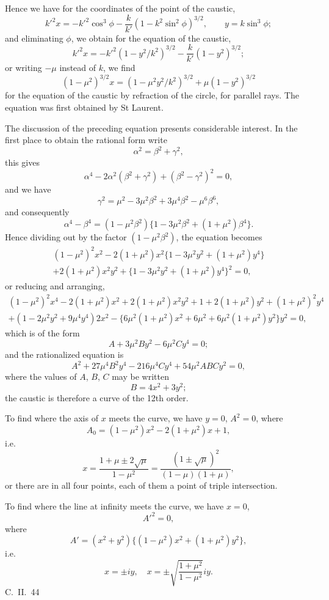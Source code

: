 \documentclass[11pt,a4paper]{article}
\begin{document}
Hence we have for the coordinates of the point of the caustic,
\[k'^2x = -k'^2\cos^3\phi - \frac{k}{k'}(1-k^2\sin^2\phi)^{3/2},\qquad y = k\sin^3\phi;\]
and eliminating $\phi$, we obtain for the equation of the caustic,
\[k'^2x = -k'^2(1-y^2/k^2)^{3/2} - \frac{k}{k'}(1-y^2)^{3/2};\]
or writing $-\mu$ instead of $k$, we find
\[(1-\mu^2)^{3/2}x = (1-\mu^2y^2/k^2)^{3/2} + \mu(1-y^2)^{3/2}\]
for the equation of the caustic by refraction of the circle, for parallel rays.
The equation was first obtained by St Laurent.

The discussion of the preceding equation presents considerable interest. In the
first place to obtain the rational form write
\[\alpha^2 = \beta^2 + \gamma^2,\]
this gives
\[\alpha^4 - 2\alpha^2(\beta^2 + \gamma^2) + (\beta^2 - \gamma^2)^2 = 0,\]
and we have
\[\gamma^2 = \mu^2 - 3\mu^2\beta^2 + 3\mu^4\beta^2 - \mu^6\beta^6,\]
and consequently
\[\alpha^4 - \beta^4 = (1-\mu^2\beta^2)\{1 - 3\mu^2\beta^2 + (1+\mu^2)\beta^4\}.\]
Hence dividing out by the factor $(1-\mu^2\beta^2)$, the equation becomes
\begin{multline*}
(1-\mu^2)^2x^2 - 2(1+\mu^2)x^2\{1 - 3\mu^2y^2 + (1+\mu^2)y^4\}\\
+ 2(1+\mu^2)x^2y^2 + \{1 - 3\mu^2y^2 + (1+\mu^2)y^4\}^2 = 0,
\end{multline*}
or reducing and arranging,
\begin{multline*}
(1-\mu^2)^2x^4 - 2(1+\mu^2)x^2 + 2(1+\mu^2)x^2y^2 + 1 + 2(1+\mu^2)y^2 + (1+\mu^2)^2y^4\\
+ (1 - 2\mu^2y^2 + 9\mu^4y^4)2x^2 - \{6\mu^2(1+\mu^2)x^2 + 6\mu^2 + 6\mu^2(1+\mu^2)y^2\}y^2 = 0,
\end{multline*}
which is of the form
\[A + 3\mu^2By^2 - 6\mu^2Cy^4 = 0;\]
and the rationalized equation is
\[A^2 + 27\mu^4B^2y^4 - 216\mu^4Cy^4 + 54\mu^2ABCy^2 = 0,\]
where the values of $A$, $B$, $C$ may be written
\[B = 4x^2 + 3y^2;\]
the caustic is therefore a curve of the 12th order.

To find where the axis of $x$ meets the curve, we have $y = 0$, $A^2 = 0$, where
\[A_0 = (1-\mu^2)x^2 - 2(1+\mu^2)x + 1,\]
i.e.
\[x = \frac{1+\mu \pm 2\sqrt{\mu}}{1-\mu^2} = \frac{(1\pm\sqrt{\mu})^2}{(1-\mu)(1+\mu)},\]
or there are in all four points, each of them a point of triple intersection.

To find where the line at infinity meets the curve, we have $x = 0$,
\[A'^2 = 0,\]
where
\[A' = (x^2+y^2)\{(1-\mu^2)x^2 + (1+\mu^2)y^2\},\]
i.e.
\[x = \pm iy,\quad x = \pm\sqrt{\frac{1+\mu^2}{1-\mu^2}}iy.\]
\hfill C.~II.~44
\end{document}
